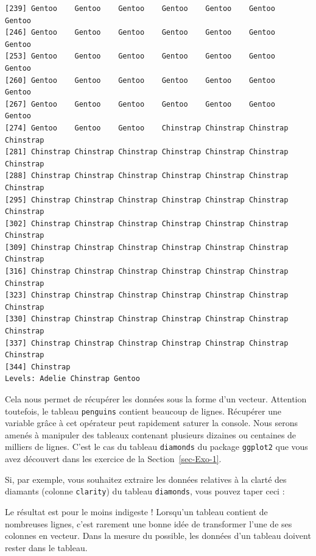 \documentclass[
  letterpaper,
  DIV=11,
  numbers=noendperiod]{scrreprt}
\newenvironment{Shaded}{\begin{snugshade}}{\end{snugshade}}
\newcommand{\FunctionTok}[1]{\textcolor[rgb]{0.28,0.35,0.67}{#1}}
\newcommand{\NormalTok}[1]{\textcolor[rgb]{0.00,0.23,0.31}{#1}}
\newcommand{\SpecialCharTok}[1]{\textcolor[rgb]{0.37,0.37,0.37}{#1}}
\begin{document}
\begin{verbatim}
[239] Gentoo    Gentoo    Gentoo    Gentoo    Gentoo    Gentoo    Gentoo   
[246] Gentoo    Gentoo    Gentoo    Gentoo    Gentoo    Gentoo    Gentoo   
[253] Gentoo    Gentoo    Gentoo    Gentoo    Gentoo    Gentoo    Gentoo   
[260] Gentoo    Gentoo    Gentoo    Gentoo    Gentoo    Gentoo    Gentoo   
[267] Gentoo    Gentoo    Gentoo    Gentoo    Gentoo    Gentoo    Gentoo   
[274] Gentoo    Gentoo    Gentoo    Chinstrap Chinstrap Chinstrap Chinstrap
[281] Chinstrap Chinstrap Chinstrap Chinstrap Chinstrap Chinstrap Chinstrap
[288] Chinstrap Chinstrap Chinstrap Chinstrap Chinstrap Chinstrap Chinstrap
[295] Chinstrap Chinstrap Chinstrap Chinstrap Chinstrap Chinstrap Chinstrap
[302] Chinstrap Chinstrap Chinstrap Chinstrap Chinstrap Chinstrap Chinstrap
[309] Chinstrap Chinstrap Chinstrap Chinstrap Chinstrap Chinstrap Chinstrap
[316] Chinstrap Chinstrap Chinstrap Chinstrap Chinstrap Chinstrap Chinstrap
[323] Chinstrap Chinstrap Chinstrap Chinstrap Chinstrap Chinstrap Chinstrap
[330] Chinstrap Chinstrap Chinstrap Chinstrap Chinstrap Chinstrap Chinstrap
[337] Chinstrap Chinstrap Chinstrap Chinstrap Chinstrap Chinstrap Chinstrap
[344] Chinstrap
Levels: Adelie Chinstrap Gentoo
\end{verbatim}

Cela nous permet de récupérer les données sous la forme d'un vecteur.
Attention toutefois, le tableau \texttt{penguins} contient beaucoup de
lignes. Récupérer une variable grâce à cet opérateur peut rapidement
saturer la console. Nous serons amenés à manipuler des tableaux
contenant plusieurs dizaines ou centaines de milliers de lignes. C'est
le cas du tableau \texttt{diamonds} du package \texttt{ggplot2} que vous
avez découvert dans les exercice de la Section~\ref{sec-Exo-1}.

Si, par exemple, vous souhaitez extraire les données relatives à la
clarté des diamants (colonne \texttt{clarity}) du tableau
\texttt{diamonds}, vous pouvez taper ceci :

\begin{Shaded}
\end{Shaded}

Le résultat est pour le moins indigeste ! Lorsqu'un tableau contient de
nombreuses lignes, c'est rarement une bonne idée de transformer l'une de
ses colonnes en vecteur. Dans la mesure du possible, les données d'un
tableau doivent rester dans le tableau.
\end{document}
